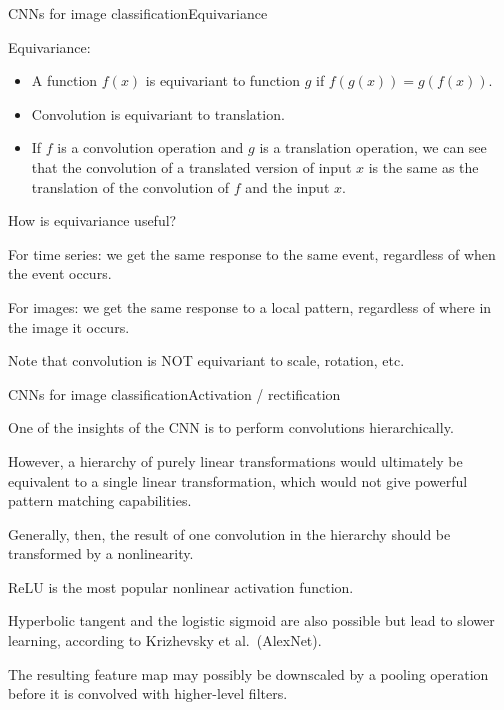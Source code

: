 \documentclass{beamer}
\begin{document}
\begin{frame}{CNNs for image classification}{Equivariance}

  \alert{Equivariance}:
  \begin{itemize}
  \item A function $f(x)$ is \alert{equivariant} to function $g$ if $f(g(x)) =
    g(f(x))$.
  \item Convolution is equivariant to \alert{translation}.
  \item If $f$ is a convolution operation and $g$ is a translation
    operation, we can see that the convolution of a translated version
    of input $x$ is the same as the translation of the convolution of
    $f$ and the input $x$.
  \end{itemize}

  \medskip
  
  How is equivariance useful?

  \medskip

  For time series: we get the same response to the same event,
  \alert{regardless of when} the event occurs.

  \medskip
  
  For images: we get the same response to a local pattern,
  \alert{regardless of where} in the image it occurs.

  \medskip
  
  Note that convolution is NOT equivariant to scale, rotation, etc.

\end{frame}


\begin{frame}{CNNs for image classification}{Activation / rectification}

  One of the insights of the CNN is to perform convolutions
  \alert{hierarchically}.

  \medskip

  However, a hierarchy of purely \alert{linear} transformations would
  ultimately be equivalent to a single linear transformation, which would
  not give powerful pattern matching capabilities.
  
  \medskip
  
  Generally, then, the result of one convolution in the hierarchy
  should be transformed by a nonlinearity.

  \medskip

  ReLU is the most popular
  nonlinear activation function.

  \medskip

  Hyperbolic tangent and the logistic sigmoid are also possible but
  lead to slower learning, according to Krizhevsky et al.\ (AlexNet).

  \medskip
  
  The resulting feature map may possibly be downscaled by a
  \alert{pooling} operation before it is convolved with higher-level
  filters.
  
\end{frame}
\end{document}
